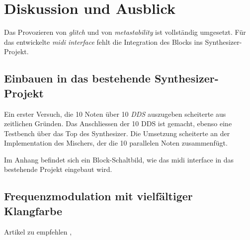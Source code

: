 
\chapter{Diskussion und Ausblick}\label{chap.diskussion}

Das Provozieren von \textit{glitch} und von \textit{metastability} ist vollständig umgesetzt. Für das entwickelte \textit{midi interface} fehlt die Integration des Blocks ins Synthesizer-Projekt. 

\section{Einbauen in das bestehende Synthesizer-Projekt}

Ein erster Versuch, die 10 Noten über 10 \textit{DDS} auszugeben scheiterte aus zeitlichen Gründen. Das Anschliessen der 10 DDS ist gemacht, ebenso eine Testbench über das Top des Synthesizer. Die Umsetzung scheiterte an der Implementation des Mischers, der die 10 parallelen Noten zusammenfügt.

Im Anhang befindet sich ein Block-Schaltbild, wie das midi interface in das bestehende Projekt eingebaut wird. 

\section{Frequenzmodulation mit vielfältiger Klangfarbe}
Artikel zu empfehlen \citep{synthesizer_1}, \citep{synthesizer_2}


